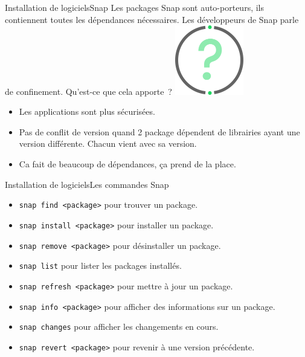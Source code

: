 \documentclass{beamer}
\begin{document}
    \begin{frame}{Installation de logiciels}{Snap}
        Les packages Snap sont auto-porteurs, ils contiennent toutes les dépendances nécessaires.
        Les développeurs de Snap parle de confinement.
        \bigbreak
        Qu'est-ce que cela apporte~?
        \bigbreak
        \centering
        \includegraphics[width=3cm]{image/question-mark}
        \pause
        \begin{itemize}
            \item Les applications sont plus sécurisées.
            \item Pas de conflit de version quand 2 package dépendent de librairies ayant une version différente.
            Chacun vient avec sa version.
            \item Ca fait de beaucoup de dépendances, ça prend de la place.
        \end{itemize}
    \end{frame}

    \begin{frame}{Installation de logiciels}{Les commandes Snap}
        \begin{itemize}
            \item \lstinline{snap find <package>} pour trouver un package.
            \item \lstinline{snap install <package>} pour installer un package.
            \item \lstinline{snap remove <package>} pour désinstaller un package.
            \item \lstinline{snap list} pour lister les packages installés.
            \item \lstinline{snap refresh <package>} pour mettre à jour un package.
            \item \lstinline{snap info <package>} pour afficher des informations sur un package.
            \item \lstinline{snap changes} pour afficher les changements en cours.
            \item \lstinline{snap revert <package>} pour revenir à une version précédente.
        \end{itemize}
    \end{frame}
\end{document}
